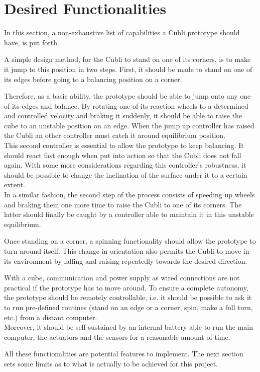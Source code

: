 \section{Desired Functionalities}\label{sec:mainFunctionalities}
In this section, a non-exhaustive list of capabilities a Cubli prototype should have, is put forth.

A simple design method, for the Cubli to stand on one of its corners, is to make it jump to this position in two steps. First, it should be made to stand on one of its edges before going to a balancing position on a corner.

Therefore, as a basic ability, the prototype should be able to jump onto any one of its edges and balance.
By rotating one of its reaction wheels to a determined and controlled velocity and braking it suddenly, it should be able to raise the cube to an unstable position on an edge. When the jump up controller has raised the Cubli an other controller must catch it around equilibrium position.\\
This second controller is essential to allow the prototype to keep balancing. It should react fast enough when put into action so that the Cubli does not fall again. With some more considerations regarding this controller's robustness, it should be possible to change the inclination of the surface under it to a certain extent.\\
In a similar fashion, the second step of the process consists of speeding up wheels and braking them one more time to raise the Cubli to one of its corners. The latter should finally be caught by a controller able to maintain it in this unstable equilibrium.

Once standing on a corner, a spinning functionality should allow the prototype to turn around itself. This change in orientation also permits the Cubli to move in its environment by falling and raising repeatedly towards the desired direction.

With a cube, communication and power supply as wired connections are not practical if the prototype has to move around. To ensure a complete autonomy, the prototype should be remotely controllable, i.e. it should be possible to ask it to run pre-defined routines (stand on an edge or a corner, spin, make a full turn, etc.) from a distant computer.\\
Moreover, it should be self-sustained by an internal battery able to run the main computer, the actuators and the sensors for a reasonable amount of time.

All these functionalities are potential features to implement. The next section sets some limits as to what is actually to be achieved for this project.